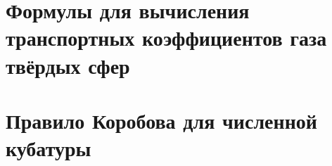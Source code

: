 
\chapter{Формулы для вычисления транспортных коэффициентов газа твёрдых сфер} \label{app:coefficients}

\chapter{Правило Коробова для численной кубатуры} \label{app:korobov}

